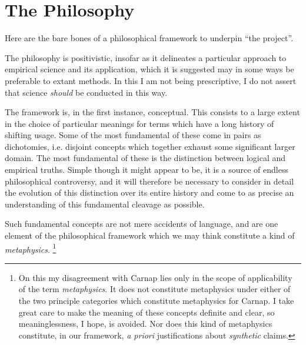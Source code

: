 \section{The Philosophy}\label{ThePhilosophy}

Here are the bare bones of a philosophical framework to underpin ``the project''.

The philosophy is positivistic, insofar as it delineates a particular
approach to empirical science and its application, which it is
suggested may in some ways be preferable to extant methods.
In this I am not being prescriptive, I do not assert that science
\emph{should} be conducted in this way.

The framework is, in the first instance, conceptual.
This consists to a large extent in the choice of particular meanings
for terms which have a long history of shifting usage.
Some of the most fundamental of these come in pairs as dichotomies,
i.e. disjoint concepts which together exhaust some significant larger
domain.
The most fundamental of these is the distinction between logical and
empirical truths.
Simple though it might appear to be, it is a source of endless
philosophical controversy, and it will therefore be necessary to
consider in detail the evolution of this distinction over its entire
history and come to as precise an understanding of this fundamental
cleavage as possible.

Such fundamental concepts are not mere accidents of language, and are
one element of the philosophical framework which we may think
constitute a kind of \emph{metaphysics}.
\footnote{On this my disagreement with Carnap lies only in the scope
  of applicability of the term \emph{metaphysics}.
It does not constitute metaphysics under either of the two principle
categories which constitute metaphysics for Carnap.
I take great care to make the meaning of these concepts definite and
clear, so meaninglessness, I hope, is avoided.
Nor does this kind of metaphysics constitute, in our framework,
\emph{a priori} justifications about \emph{synthetic} claims.
}%
